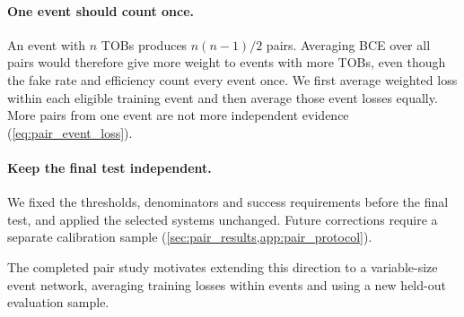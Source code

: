 \paragraph{One event should count once.}
An event with $n$ TOBs produces $n(n-1)/2$ pairs. Averaging BCE over all pairs
would therefore give more weight to events with more TOBs, even though the fake
rate and efficiency count every event once. We first average weighted loss within each eligible training event and then
average those event losses equally. More pairs from one event are not more
independent evidence (\cref{eq:pair_event_loss}).

\paragraph{Keep the final test independent.}
We fixed the thresholds, denominators and success requirements before the
final test, and applied the selected systems unchanged. Future corrections
require a separate calibration sample
(\cref{sec:pair_results,app:pair_protocol}).


The completed pair study motivates extending this direction to a variable-size
event network, averaging training losses within events and using a new
held-out evaluation sample.
